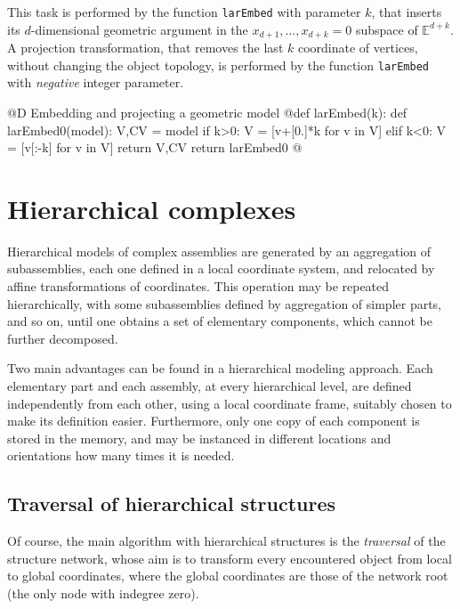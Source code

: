 \documentclass[11pt,oneside]{article}    %
\def\E{\mathbb{E}}
\begin{document}
This task is performed by the function \texttt{larEmbed} with parameter $k$, that inserts its $d$-dimensional geometric argument in the $x_{d+1}, \ldots, x_{d+k}=0$ subspace of $\E^{d+k}$.
A projection transformation, that removes the last $k$ coordinate of vertices, without changing the object topology, is performed by the function \texttt{larEmbed} with \emph{negative} integer parameter.


@D Embedding and projecting a geometric model
@{def larEmbed(k):
	def larEmbed0(model):
		V,CV = model
		if k>0:
			V = [v+[0.]*k for v in V] 
		elif k<0:
			V = [v[:-k] for v in V] 
		return V,CV
	return larEmbed0
@}

\section{Hierarchical complexes}
Hierarchical models of complex assemblies are generated by an aggregation
of subassemblies, each one defined in a local coordinate system, and
relocated by affine transformations of coordinates.  This operation
may be repeated hierarchically, with some subassemblies defined by
aggregation of simpler parts, and so on, until one obtains a set of
elementary components, which cannot be further decomposed.

Two main advantages can be found in a hierarchical modeling approach. Each elementary part and each assembly, at every hierarchical level, are defined independently from each other, using a local coordinate frame, suitably chosen to make its definition easier. Furthermore, only one copy of each component is stored in the memory, and may be instanced in different locations and orientations how many times it is needed.

\subsection{Traversal of hierarchical structures}

Of course, the main algorithm with hierarchical structures is the \emph{traversal} of the structure network, whose aim is to transform every encountered object from local to global coordinates, where the global coordinates are those of the network root (the only node with indegree zero).
\end{document}

